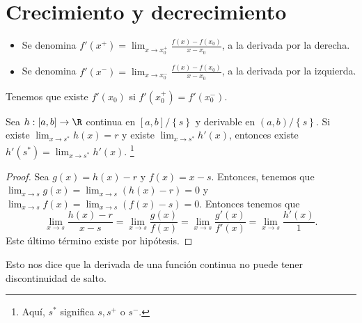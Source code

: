 \section{Crecimiento y decrecimiento}
\begin{notation}
\normalfont 
\begin{itemize}
\item Se denomina $\displaystyle f'\left(x^{+}\right) = \lim_{x \to x_{0}^{+}}\frac{f\left(x\right)-f\left(x_{0}\right)}{x - x_{0}} $, a la derivada por la derecha.
\item Se denomina $\displaystyle f'\left(x^{-}\right) = \lim_{x \to x_{0}^{-}}\frac{f\left(x\right)-f\left(x_{0}\right)}{x-x_{0}} $, a la derivada por la izquierda.
\end{itemize}
\end{notation}
\begin{observation}
\normalfont Tenemos que existe $\displaystyle f'\left(x_{0}\right) $ si $\displaystyle f'\left(x_{0}^{+}\right) = f'\left(x_{0}^{-}\right) $.
\end{observation}
\begin{fcolorary}[]
	\normalfont Sea $\displaystyle h: \left[a,b\right] \to \R $ continua en $\displaystyle \left[a,b\right] / \left\{ s\right\}  $ y derivable en $\displaystyle \left(a,b\right) / \left\{ s\right\}  $. Si existe $\displaystyle \lim_{x \to s^{*}}h\left(x\right) = r $ y existe $\displaystyle \lim_{x \to s^{*}}h'\left(x\right) $, entonces existe $\displaystyle h'\left(s^{*}\right) = \lim_{x \to s^{*}}h'\left(x\right) $. \footnote{Aquí, $\displaystyle s^{*} $ significa $\displaystyle s, s^{+} $ o $\displaystyle s^{-} $.} 
\end{fcolorary}
\begin{proof}
Sea $\displaystyle g\left(x\right) = h\left(x\right)-r $ y $\displaystyle f\left(x\right) = x - s $. Entonces, tenemos que $\displaystyle \lim_{x \to s}g\left(x\right) = \lim_{x \to s}\left(h\left(x\right)-r\right) = 0 $ y $\displaystyle \lim_{x \to s}f\left(x\right) = \lim_{x \to s}\left(f\left(x\right)-s\right) = 0 $. Entonces tenemos que
\[\lim_{x \to s}\frac{h\left(x\right)-r}{x-s}=\lim_{x \to s}\frac{g\left(x\right)}{f\left(x\right)} = \lim_{x \to s}\frac{g'\left(x\right)}{f'\left(x\right)} = \lim_{x \to s}\frac{h'\left(x\right)}{1} .\]
Este último término existe por hipótesis.
\end{proof}
\begin{observation}
\normalfont Esto nos dice que la derivada de una función continua no puede tener discontinuidad de salto.
\end{observation}
